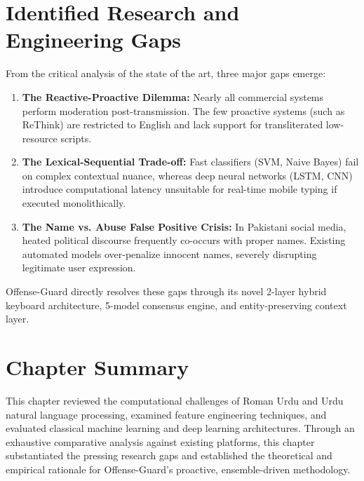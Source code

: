 \documentclass[A4paper,12pt]{report}
\theoremstyle{plain}
\theoremstyle{definition}
\theoremstyle{remark}
\numberwithin{equation}{section}
\begin{document}
\section{Identified Research and Engineering Gaps}
From the critical analysis of the state of the art, three major gaps emerge:
\begin{enumerate}[leftmargin=*]
    \item \textbf{The Reactive-Proactive Dilemma:} Nearly all commercial systems perform moderation post-transmission. The few proactive systems (such as ReThink) are restricted to English and lack support for transliterated low-resource scripts.
    \item \textbf{The Lexical-Sequential Trade-off:} Fast classifiers (SVM, Naive Bayes) fail on complex contextual nuance, whereas deep neural networks (LSTM, CNN) introduce computational latency unsuitable for real-time mobile typing if executed monolithically.
    \item \textbf{The Name vs. Abuse False Positive Crisis:} In Pakistani social media, heated political discourse frequently co-occurs with proper names. Existing automated models over-penalize innocent names, severely disrupting legitimate user expression.
\end{enumerate}

Offense-Guard directly resolves these gaps through its novel 2-layer hybrid keyboard architecture, 5-model consensus engine, and entity-preserving context layer.

\section{Chapter Summary}
This chapter reviewed the computational challenges of Roman Urdu and Urdu natural language processing, examined feature engineering techniques, and evaluated classical machine learning and deep learning architectures. Through an exhaustive comparative analysis against existing platforms, this chapter substantiated the pressing research gaps and established the theoretical and empirical rationale for Offense-Guard's proactive, ensemble-driven methodology.
\end{document}
